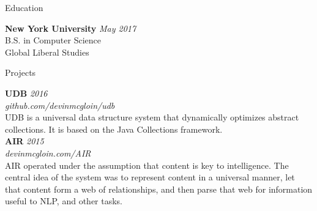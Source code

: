 \documentclass{resume} %
\begin{document}

\begin{rSection}{Education}

{\bf New York University} \hfill {\em May 2017} \\ 
B.S. in Computer Science \\
Global Liberal Studies \\

\end{rSection}


\begin{rSection}{Projects}

{\bf UDB} \hfill {\em 2016} \\ 
{\em github.com/devinmcgloin/udb}\\
UDB is a universal data structure system that dynamically optimizes abstract collections. It is based on the Java Collections framework. \\


{\bf AIR} \hfill {\em 2015} \\ 
{\em devinmcgloin.com/AIR}\\
AIR operated under the assumption that content is key to intelligence. The central idea of the system was to represent content in a universal manner, let that content form a web of relationships, and then parse that web for information useful to NLP, and other tasks. \\

\end{rSection}

\end{document}
